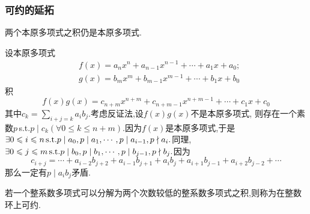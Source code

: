 \subsubsection{可约的延拓}
\begin{green}
\begin{lemma}[Gauss引理]\label{lem:Gauss引理}
    两个本原多项式之积仍是本原多项式.
\end{lemma}
\begin{Proof}
设本原多项式
\begin{align*}
    &f\left(x\right)=a_nx^n+a_{n-1}x^{n-1}+\cdots+a_1x+a_0;\\
&g\left(x\right)=b_mx^m+b_{m-1}x^{m-1}+\cdots+b_1x+b_0
\end{align*}
积\[
f\left(x\right)g\left(x\right)=c_{n+m}x^{n+m}+
c_{n+m-1}x^{n+m-1}+\cdots+c_1x+c_0
\]
其中$\displaystyle
c_k=\sum_{i+j=k}a_ib_j.$考虑反证法,设$f\left(x\right)g\left(x\right)$不是本原多项式,
则存在一个素数$p$\,\textup{s.t.}$p\mid c_k\left(\forall 0\leqslant 
k\leqslant n+m \right)$.因为$f\left(x\right)$是本原多项式,于是$\exists 0\leqslant i\leqslant n\,\textup{s.t.}
p\mid a_0,p\mid a_1,\cdots,p\mid a_{i-1},p\nmid a_i.$同理,
$\exists 0\leqslant j\leqslant m\,\textup{s.t.}p\mid b_0,p\mid b_1,\cdots
,p\mid b_{j-1},p\nmid b_j.$因为
\[
c_{i+j}=\cdots+a_{i-2}b_{j+2}+a_{i-1}b_{j+1}+a_ib_j+a_{i+1}b_{j-1}+a_{i+2}b_{j-2}+\cdots
\]
那么一定有$p\mid a_ib_j$矛盾.
\end{Proof}
\end{green}
\begin{formal}
\begin{definition}[整数环上的可约与不可约]\label{def:整数环上的可约与不可约}
    若一个整系数多项式可以分解为两个次数较低的整系数多项式之积,则称为在整数环上可约.
\end{definition}
\end{formal}
